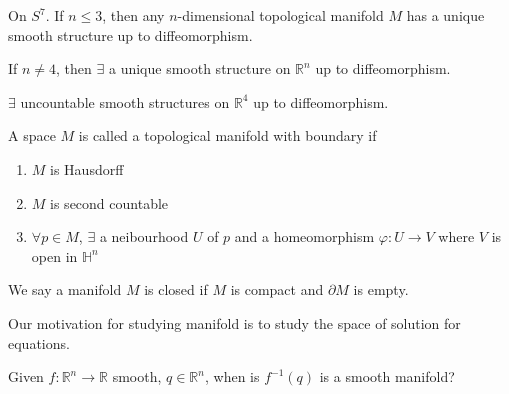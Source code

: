 \begin{theorem}
    On  $ S^7  $. If  $ n \leq 3  $, then any  $ n  $-dimensional topological manifold  $ M  $ has a unique smooth structure up to diffeomorphism.
\end{theorem}
\begin{theorem}[Stallings]
    If  $ n\not=4  $, then  $ \exists  $ a unique smooth structure on  $ \mathbb{R}^n  $ up to diffeomorphism.
\end{theorem}
\begin{theorem}
     $ \exists  $ uncountable smooth structures on  $ \mathbb{R}^4 $ up to diffeomorphism. 
\end{theorem}
\begin{definition}
    A space  $ M  $ is called a topological manifold with boundary if 
    \begin{enumerate}
        \item  $ M  $ is Hausdorff
        \item  $ M  $ is second countable 
        \item  $ \forall  p\in M $,  $ \exists   $ a neibourhood  $ U  $ of  $ p  $ and a homeomorphism  $ \varphi:U\rightarrow V    $  where  $ V  $ is open in  $ \mathbb{H}^n $ 
    \end{enumerate}
    We say a manifold  $ M  $ is closed if  $ M  $ is compact and  $ \partial M  $ is empty.
\end{definition}
Our motivation for studying manifold is to study the space of solution for equations.
\begin{question}
    Given  $ f:\mathbb{R}^n\rightarrow \mathbb{R} $ smooth,  $ q\in \mathbb{R}^n $, when is  $ f^{-1}(q)  $ is a smooth manifold?
\end{question}

